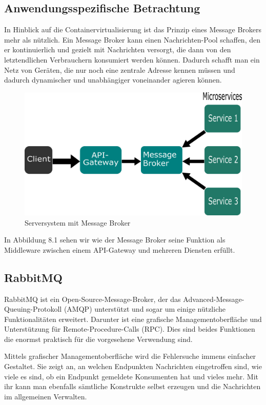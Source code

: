 \documentclass[12pt,a4paper]{scrartcl}
\begin{document}
\subsection{Anwendungsspezifische Betrachtung}
In Hinblick auf die Containervirtualisierung ist das Prinzip eines Message Brokers mehr als nützlich.
Ein Message Broker kann einen Nachrichten-Pool schaffen, den er kontinuierlich und gezielt mit Nachrichten versorgt, die dann von den letztendlichen Verbrauchern konsumiert werden können. Dadurch schafft man ein Netz von Geräten, die nur noch eine zentrale Adresse kennen müssen und dadurch dynamischer und unabhängiger voneinander agieren können. 

\begin{figure}[h!]
	\centering
	\includegraphics[scale=1.8]{MesBroSys.png}
	\caption[Selbst erstellte Grafik]{Serversystem mit Message Broker}
\end{figure}

In Abbildung 8.1 sehen wir wie der Message Broker seine Funktion als Middleware zwischen einem API-Gateway und mehreren Diensten erfüllt.  

\subsection{RabbitMQ}
RabbitMQ ist ein Open-Source-Message-Broker, der das Advanced-Message-Queuing-Protokoll (AMQP) unterstützt und sogar um einige nützliche Funktionalitäten erweitert\cite{rabExt}.
Darunter ist eine grafische Managementoberfläche und Unterstützung für Remote-Procedure-Calls (RPC). Dies sind beides Funktionen die enormst praktisch für die vorgesehene Verwendung sind.

Mittels grafischer Managementoberfläche wird die Fehlersuche immens einfacher Gestaltet. Sie zeigt an, an welchen Endpunkten Nachrichten eingetroffen sind, wie viele es sind, ob ein Endpunkt gemeldete Konsumenten hat und vieles mehr. Mit ihr kann man ebenfalls sämtliche Konstrukte selbst erzeugen und die Nachrichten im allgemeinen Verwalten. 
\end{document}
